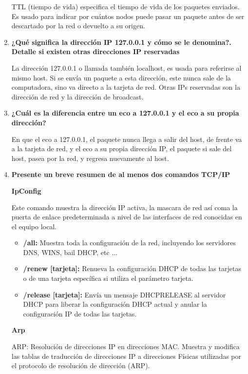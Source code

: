 \documentclass[a4paper,12pt]{article}
\begin{document}
\begin{enumerate}
 TTL (tiempo de vida) especifica el tiempo de vida de los paquetes enviados. Es usado para indicar por cuántos nodos
 puede pasar un paquete antes de ser descartado por la red o devuelto a su origen.
 
 \item \textbf{¿Qué significa la dirección IP 127.0.0.1 y cómo se le denomina?. Detalle si existen otras direcciones IP reservadas}
 
 La dirección 127.0.0.1 o llamada también localhost, es usada para referirse al mismo host. Si se envía un paquete a esta dirección, este nunca
 sale de la computadora, sino va directo a la tarjeta de red. Otras IPs reservadas son la dirección de red y la dirección de broadcast.
 
 \item \textbf{¿Cuál es la diferencia entre un eco a 127.0.0.1 y el eco a su propia dirección?}
 
 En que el eco a 127.0.0.1, el paquete nunca llega a salir del host, de frente va a la tarjeta de red, y el eco a su propia
 dirección IP, el paquete si sale del host, pasea por la red, y regresa nuevamente al host.
 
 \item \textbf{Presente un breve resumen de al menos dos comandos TCP/IP}
 
 \textbf{IpConfig}
 
 Este comando muestra la dirección IP activa, la mascara de red así coma la puerta de enlace predeterminada a nivel de las interfaces
 de red conocidas en el equipo local.
 \begin{itemize}
  \item \textbf{/all:} Muestra toda la configuración de la red, incluyendo los servidores DNS, WINS, bail DHCP, etc ...
  \item \textbf{/renew [tarjeta]:} Renueva la configuración DHCP de todas las tarjetas o de una tarjeta específica si utiliza el parámetro tarjeta.
  \item \textbf{/release [tarjeta]:} Envía un mensaje DHCPRELEASE al servidor DHCP para liberar la configuración DHCP actual y anular la configuración IP de todas las tarjetas.
 \end{itemize}
 
 \textbf{Arp}
 
 ARP: Resolución de direcciones IP en direcciones MAC. Muestra y modifica las tablas de traducción de direcciones IP a direcciones Físicas utilizadas por el protocolo de resolución de dirección (ARP). 
 

\end{enumerate}
\end{document}
